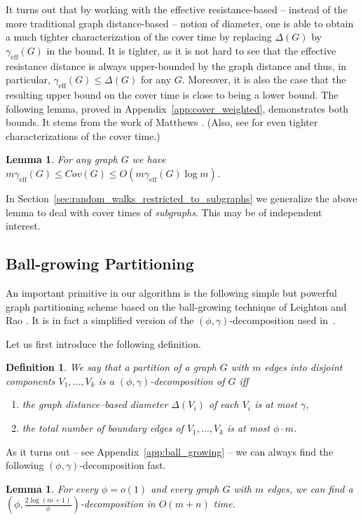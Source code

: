 \documentclass[11pt, letterpaper]{article}
\newtheorem{lemma}[theorem]{Lemma}
\newtheorem{definition}[theorem]{Definition}
\newcommand{\diameff}{\gamma_{\mathrm{eff}}}
\newcommand{\diamdist}{\Delta}
\begin{document}
It turns out that by working with the effective resistance-based -- instead of the more traditional graph distance-based -- notion of diameter, one is able to obtain a much tighter characterization of the cover time by replacing $\diamdist(G)$ by $\diameff(G)$ in the bound. It is tighter, as it is not hard to see that the effective resistance distance is always upper-bounded by the graph distance and thus, in particular, $\diameff(G)\leq\diamdist(G)$ for any $G$. Moreover, it is also the case that the resulting upper bound on the cover time is close to being a lower bound. The following lemma, proved in Appendix~\ref{app:cover_weighted}, demonstrates both bounds. It stems from the work of Matthews \cite{Matthews88}. (Also, see \cite{KahnKLV00,DingLP12} for even tighter characterizations of the cover time.) 

\begin{lemma}\label{lem:cover_weighted}
For any graph $G$ we have $m \diameff(G)\leq Cov(G)\leq O(m \diameff(G)\log m)$.
\end{lemma}

In Section~\ref{sec:random_walks_restricted_to_subgraphs} we generalize the above lemma to deal with cover times of {\em subgraphs}. This may be of independent interest.

\subsection{Ball-growing Partitioning} \label{sec:ball_growing}

An important primitive in our algorithm is the following simple but powerful graph partitioning scheme based on the ball-growing technique of Leighton and Rao \cite{LeightonR99}. It is in fact a simplified version of the $(\phi,\gamma)$-decomposition used in~\cite{KelnerM09}.

Let us first introduce the following definition.
\begin{definition}\label{def:ball_decomp}
We say that a partition of a graph $G$ with $m$ edges into disjoint components $V_1,\ldots,V_k$ is a $(\phi, \gamma)$-decomposition of $G$ iff
\vspace{-7pt}
\begin{enumerate}[(1)]\addtolength{\itemsep}{-.5\baselineskip}
\item the graph distance--based diameter $\diamdist(V_i)$ of each $V_i$ is at most $\gamma$,
\item the total number of boundary edges of $V_1,\ldots, V_k$ is at most $\phi \cdot m$.
\end{enumerate}
\end{definition}
As it turns out -- see Appendix~\ref{app:ball_growing} -- we can always find the following $(\phi,\gamma)$-decomposition fast.
\begin{lemma}\label{lem:ball_growing}
For every $\phi=o(1)$ and every graph $G$ with $m$ edges, we can find a $\left(\phi, \frac{2\log (m+1)}{\phi}\right)$-decomposition in $O(m+n)$ time.
\end{lemma}
\end{document}
